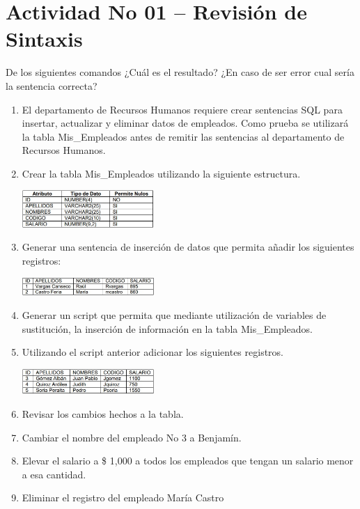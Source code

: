\section{Actividad No 01 – Revisi\'on de Sintaxis} 
De los siguientes comandos ¿Cuál es el resultado? ¿En caso de ser error cual sería la sentencia correcta?

\begin{enumerate}[1.]
	\item El departamento de Recursos Humanos requiere crear sentencias SQL para insertar, actualizar y eliminar datos de empleados. Como prueba se utilizará la tabla Mis\_Empleados antes de remitir las sentencias al departamento de Recursos Humanos.
	\item Crear la tabla Mis\_Empleados utilizando la siguiente estructura.
	\begin{center}
	\includegraphics[width=5cm]{./Imagenes/imagen0102} 
	\end{center}
	\item Generar una sentencia de inserción de datos que permita añadir los siguientes registros:
	\begin{center}
	\includegraphics[width=5cm]{./Imagenes/imagen0103} 
	\end{center}
	\item Generar un script que permita que mediante utilización de variables de sustitución, la inserción de información en la tabla Mis\_Empleados.
	\item Utilizando el script anterior adicionar los siguientes registros.
	\begin{center}
	\includegraphics[width=5cm]{./Imagenes/imagen0105} 
	\end{center}
	\item Revisar los cambios hechos a la tabla.
	\item Cambiar el nombre del empleado No 3 a Benjamín.
	\item Elevar el salario a \$ 1,000 a todos los empleados que tengan un salario menor a esa cantidad.
	\item Eliminar el registro del empleado María Castro

\end{enumerate}
